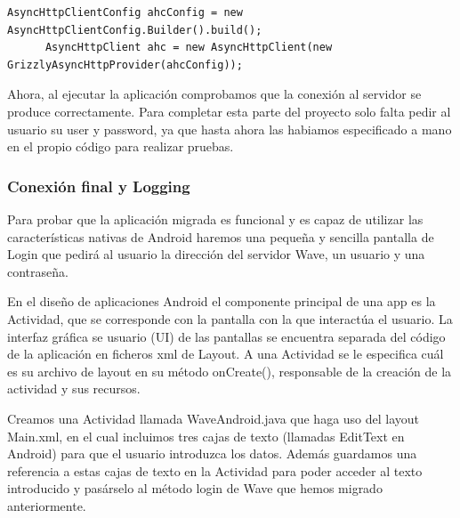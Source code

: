 	  \begin{lstlisting}[frame=single]	
	  AsyncHttpClientConfig ahcConfig = new AsyncHttpClientConfig.Builder().build();
      AsyncHttpClient ahc = new AsyncHttpClient(new GrizzlyAsyncHttpProvider(ahcConfig));
      \end{lstlisting}
      
      Ahora, al ejecutar la aplicación comprobamos que la conexión al servidor se produce correctamente. Para completar esta parte del proyecto solo falta pedir al usuario su user y password, ya que hasta ahora las habiamos especificado a mano en el propio código para realizar pruebas.
	    
    		\subsubsection{Conexión final y Logging}
    
    Para probar que la aplicación migrada es funcional y es capaz de utilizar las características nativas de Android haremos una pequeña y sencilla pantalla de Login que pedirá al usuario la dirección del servidor Wave, un usuario y una contraseña.
    
    En el diseño de aplicaciones Android el componente principal de una app es la Actividad, que se corresponde con la pantalla con la que interactúa el usuario. La interfaz gráfica se usuario (UI) de las pantallas se encuentra separada del código de la aplicación en ficheros xml de Layout\cite{ref:android_ui}. A una Actividad se le especifica cuál es su archivo de layout en su método onCreate(), responsable de la creación de la actividad y sus recursos. 
    
    Creamos una Actividad llamada WaveAndroid.java que haga uso del layout Main.xml, en el cual incluimos tres cajas de texto (llamadas EditText en Android) para que el usuario introduzca los datos. Además guardamos una referencia a estas cajas de texto en la Actividad para poder acceder al texto introducido y pasárselo al método login de Wave que hemos migrado anteriormente.
    
